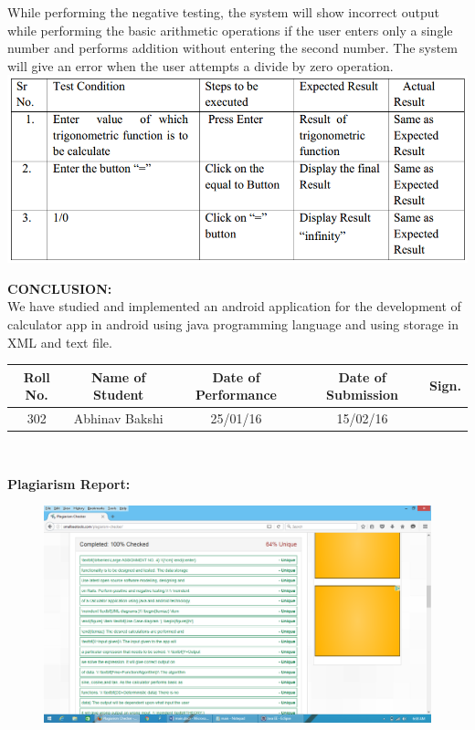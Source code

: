 \documentclass[a4paper,12pt]{article}
\begin{document}
\begin{itemize}
While performing the negative testing, the system will show incorrect output while performing the basic arithmetic operations if the user enters only a single number and performs addition without entering the second number. The system will give an error when the user attempts a divide by zero operation.\\
\includegraphics[width=\textwidth]{trig_positive}


\end{itemize}




\noindent \textbf{CONCLUSION: }	\\
We have studied and implemented an android application for the development of calculator app in android using java programming language and using storage in XML and text file.
\begin{center}
\begin{tabular}
{|c|c|c|c|c|}\hline
{\bf Roll No.}		&{\bf Name of Student}	&{\bf Date of Performance}  				&{\bf Date of Submission}	&{\bf Sign.}  \\    \hline
{302}	&	{Abhinav Bakshi}& 	{25/01/16}	&  {15/02/16} \\ \hline
\end{tabular}\\ 
\end{center}

\newpage
\noindent \textbf{Plagiarism Report: }	\\

\begin{figure}[h!]
	\centering
	\includegraphics[scale=0.5]{a5_trig.png}
\end{figure}
\end{document}
